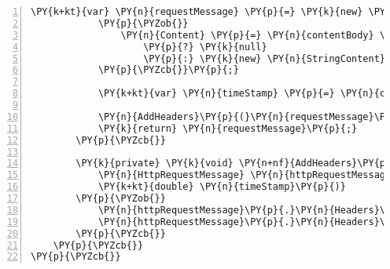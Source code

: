 \begin{Verbatim}[commandchars=\\\{\},numbers=left,firstnumber=1,stepnumber=1,numberblanklines=0]
            \PY{k+kt}{var} \PY{n}{requestMessage} \PY{p}{=} \PY{k}{new} \PY{n}{HttpRequestMessage}\PY{p}{(}\PY{n}{httpMethod}\PY{p}{,} \PY{k}{new} \PY{n}{Uri}\PY{p}{(}\PY{k}{new} \PY{n}{Uri}\PY{p}{(}\PY{n}{apiUri}\PY{p}{)}\PY{p}{,} \PY{n}{requestUri}\PY{p}{)}\PY{p}{)}
            \PY{p}{\PYZob{}}
                \PY{n}{Content} \PY{p}{=} \PY{n}{contentBody} \PY{p}{=}\PY{p}{=} \PY{k+kt}{string}\PY{p}{.}\PY{n}{Empty}
                    \PY{p}{?} \PY{k}{null}
                    \PY{p}{:} \PY{k}{new} \PY{n}{StringContent}\PY{p}{(}\PY{n}{contentBody}\PY{p}{,} \PY{n}{Encoding}\PY{p}{.}\PY{n}{UTF8}\PY{p}{,} \PY{l+s}{\PYZdq{}application/json\PYZdq{}}\PY{p}{)}
            \PY{p}{\PYZcb{}}\PY{p}{;}

            \PY{k+kt}{var} \PY{n}{timeStamp} \PY{p}{=} \PY{n}{clock}\PY{p}{.}\PY{n}{GetTime}\PY{p}{(}\PY{p}{)}\PY{p}{.}\PY{n}{ToTimeStamp}\PY{p}{(}\PY{p}{)}\PY{p}{;}

            \PY{n}{AddHeaders}\PY{p}{(}\PY{n}{requestMessage}\PY{p}{,} \PY{n}{timeStamp}\PY{p}{)}\PY{p}{;}
            \PY{k}{return} \PY{n}{requestMessage}\PY{p}{;}
        \PY{p}{\PYZcb{}}

        \PY{k}{private} \PY{k}{void} \PY{n+nf}{AddHeaders}\PY{p}{(}
            \PY{n}{HttpRequestMessage} \PY{n}{httpRequestMessage}\PY{p}{,}
            \PY{k+kt}{double} \PY{n}{timeStamp}\PY{p}{)}
        \PY{p}{\PYZob{}}
            \PY{n}{httpRequestMessage}\PY{p}{.}\PY{n}{Headers}\PY{p}{.}\PY{n}{Add}\PY{p}{(}\PY{l+s}{\PYZdq{}User\PYZhy{}Agent\PYZdq{}}\PY{p}{,} \PY{l+s}{\PYZdq{}GDAXClient\PYZdq{}}\PY{p}{)}\PY{p}{;}
            \PY{n}{httpRequestMessage}\PY{p}{.}\PY{n}{Headers}\PY{p}{.}\PY{n}{Add}\PY{p}{(}\PY{l+s}{\PYZdq{}CB\PYZhy{}ACCESS\PYZhy{}TIMESTAMP\PYZdq{}}\PY{p}{,} \PY{n}{timeStamp}\PY{p}{.}\PY{n}{ToString}\PY{p}{(}\PY{l+s}{\PYZdq{}F0\PYZdq{}}\PY{p}{,} \PY{n}{CultureInfo}\PY{p}{.}\PY{n}{InvariantCulture}\PY{p}{)}\PY{p}{)}\PY{p}{;}
        \PY{p}{\PYZcb{}}
    \PY{p}{\PYZcb{}}
\PY{p}{\PYZcb{}}
\end{Verbatim}
